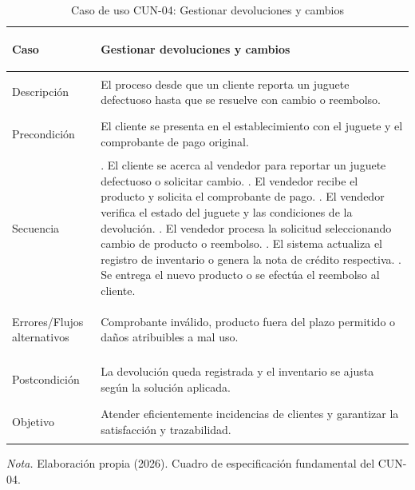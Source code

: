 \begin{table}[H]
  \centering
  \caption{Caso de uso CUN-04: Gestionar devoluciones y cambios}
  \label{tab:cun_04}
  {\small
  \setlength{\tabcolsep}{4pt}
  \renewcommand{\arraystretch}{1.05}
  \begin{tabularx}{\textwidth}{|>{\bfseries\raggedright\arraybackslash}p{3.2cm}|>{\raggedright\arraybackslash}X|}
    \hline
    Caso & Gestionar devoluciones y cambios \\
    \hline
    Descripción & El proceso desde que un cliente reporta un juguete defectuoso hasta que se resuelve con cambio o reembolso. \\
    \hline
    Precondición & El cliente se presenta en el establecimiento con el juguete y el comprobante de pago original. \\
    \hline
    Secuencia &
    1. El cliente se acerca al vendedor para reportar un juguete defectuoso o solicitar cambio. \newline
    2. El vendedor recibe el producto y solicita el comprobante de pago. \newline
    3. El vendedor verifica el estado del juguete y las condiciones de la devolución. \newline
    4. El vendedor procesa la solicitud seleccionando cambio de producto o reembolso. \newline
    5. El sistema actualiza el registro de inventario o genera la nota de crédito respectiva. \newline
    6. Se entrega el nuevo producto o se efectúa el reembolso al cliente. \\
    \hline
    Errores/Flujos alternativos & Comprobante inválido, producto fuera del plazo permitido o daños atribuibles a mal uso. \\
    \hline
    Postcondición & La devolución queda registrada y el inventario se ajusta según la solución aplicada. \\
    \hline
    Objetivo & Atender eficientemente incidencias de clientes y garantizar la satisfacción y trazabilidad. \\
    \hline
  \end{tabularx}}
  \par\vspace{0.2ex}
  \raggedright\noindent\small \emph{Nota.} Elaboración propia (2026). Cuadro de especificación fundamental del CUN-04.
\end{table}


